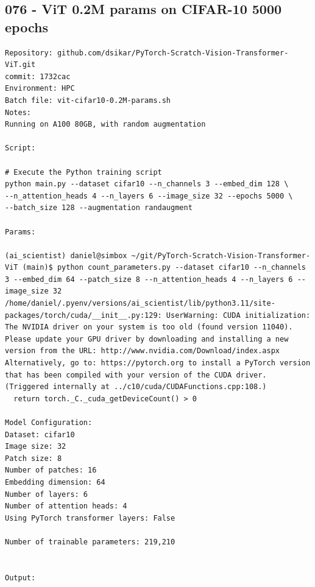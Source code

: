 \subsection{076 - ViT 0.2M params on CIFAR-10 5000 epochs}
\label{app_res:075}
\begin{verbatim}
Repository: github.com/dsikar/PyTorch-Scratch-Vision-Transformer-ViT.git
commit: 1732cac
Environment: HPC 
Batch file: vit-cifar10-0.2M-params.sh
Notes: 
Running on A100 80GB, with random augmentation

Script:

# Execute the Python training script
python main.py --dataset cifar10 --n_channels 3 --embed_dim 128 \
--n_attention_heads 4 --n_layers 6 --image_size 32 --epochs 5000 \
--batch_size 128 --augmentation randaugment

Params: 

(ai_scientist) daniel@simbox ~/git/PyTorch-Scratch-Vision-Transformer-ViT (main)$ python count_parameters.py --dataset cifar10 --n_channels 3 --embed_dim 64 --patch_size 8 --n_attention_heads 4 --n_layers 6 --image_size 32 
/home/daniel/.pyenv/versions/ai_scientist/lib/python3.11/site-packages/torch/cuda/__init__.py:129: UserWarning: CUDA initialization: The NVIDIA driver on your system is too old (found version 11040). Please update your GPU driver by downloading and installing a new version from the URL: http://www.nvidia.com/Download/index.aspx Alternatively, go to: https://pytorch.org to install a PyTorch version that has been compiled with your version of the CUDA driver. (Triggered internally at ../c10/cuda/CUDAFunctions.cpp:108.)
  return torch._C._cuda_getDeviceCount() > 0

Model Configuration:
Dataset: cifar10
Image size: 32
Patch size: 8
Number of patches: 16
Embedding dimension: 64
Number of layers: 6
Number of attention heads: 4
Using PyTorch transformer layers: False

Number of trainable parameters: 219,210


Output:



\end{verbatim}

